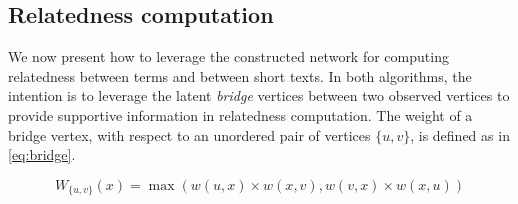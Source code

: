 
\subsection{Relatedness computation}
\label{sec:relatedness}

We now present how to leverage the constructed network for computing
relatedness between terms and between short texts.  In both algorithms,
the intention is to leverage the latent {\em bridge} 
vertices between two observed vertices to provide supportive information 
in relatedness computation.
The weight of a bridge vertex, with respect to an unordered pair of 
vertices $\{u, v\}$, is defined as in \eqref{eq:bridge}.

\begin{equation}
W_{\{u,v\}}(x) = \max(w(u,x)\times w(x,v), w(v,x)\times w(x,u))
\label{eq:bridge}
\end{equation}


